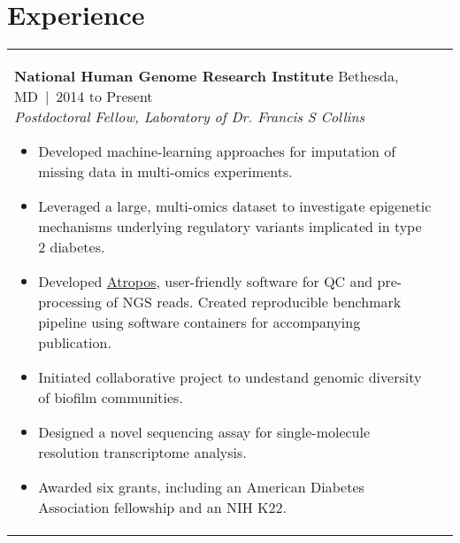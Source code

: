 \documentclass[11pt,letter,sans]{moderncv}
\makeatletter
\newenvironment{entrylistFive}{%
  \begin{longtable}{@{\extracolsep{\fill}}ll}
}{%
  \end{longtable}
}
\newcommand{\entryFive}[5]{%
  \parbox[t]{170mm}{%
    \textbf{#2}%
    \hfill%
    {\footnotesize #3~|~#1}\\%
	\emph{#4}\\%
    #5\vspace{\parsep}%
  }\\}
\makeatother
\begin{document}
\section{Experience}
\begin{entrylistFive}
\entryFive
{2014 to Present}
{National Human Genome Research Institute}
{Bethesda, MD}
{Postdoctoral Fellow, Laboratory of Dr. Francis S Collins}
{\vspace{-5mm}
\begin{itemize}
\item {Developed machine-learning approaches for imputation of missing data in multi-omics experiments.}
\item {Leveraged a large, multi-omics dataset to investigate epigenetic mechanisms underlying regulatory variants implicated in type 2 diabetes.}
\item {Developed \href{http://github.com/jdidion/atropos}{Atropos}, user-friendly software for QC and pre-processing of NGS reads. Created reproducible benchmark pipeline using software containers for accompanying publication.}
\item {Initiated collaborative project to undestand genomic diversity of biofilm communities.}
\item {Designed a novel sequencing assay for single-molecule resolution transcriptome analysis.}
\item {Awarded six grants, including an American Diabetes Association fellowship and an NIH K22.}
\end{itemize}
}

\entryFive
{2016 to Present}
{American Academy of Bioinformatics}
{Bethesda, MD}
{Instructor of Bioinformatics}
{\vspace{-5mm}
\begin{itemize}
\item {Developed comprehensive, open-source course materials for workshops in DNA-Seq and RNA-Seq data analysis.}
\item {Taught workshops and earned highly positive student reviews.}
\end{itemize}
}


\end{entrylistFive}
\end{document}
